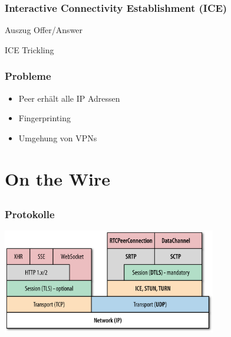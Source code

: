 \documentclass[12pt]{beamer}
\begin{document}

\begin{frame}
  \frametitle{Interactive Connectivity Establishment (ICE)}
  \pause
  
  \hfill \tiny Auszug Offer/Answer
  \vspace{15pt}
  \pause
  
  
  \hfill \tiny ICE Trickling
\end{frame}

\begin{frame}
  \frametitle{Probleme}
  \begin{itemize}
    \item<2-> Peer erhält alle IP Adressen
    \item<3-> Fingerprinting
    \item<4-> Umgehung von VPNs
  \end{itemize}
\end{frame}


\section{On the Wire}
\subsection{} 

\begin{frame}
  \frametitle{Protokolle}
  \centerline{\includegraphics[width=0.7\textwidth]{img/stack_oreilly.png}}
\end{frame}
\end{document}
